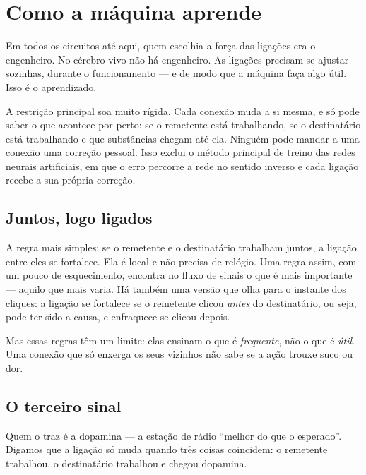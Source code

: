\chapter{Como a máquina aprende}

Em todos os circuitos até aqui, quem escolhia a força das ligações era o engenheiro. No cérebro vivo não há engenheiro. As ligações precisam se ajustar sozinhas, durante o funcionamento --- e de modo que a máquina faça algo útil. Isso é o aprendizado.

A restrição principal soa muito rígida. Cada conexão muda a si mesma, e só pode saber o que acontece por perto: se o remetente está trabalhando, se o destinatário está trabalhando e que substâncias chegam até ela. Ninguém pode mandar a uma conexão uma correção pessoal. Isso exclui o método principal de treino das redes neurais artificiais, em que o erro percorre a rede no sentido inverso e cada ligação recebe a sua própria correção.

\section*{Juntos, logo ligados}

A regra mais simples: se o remetente e o destinatário trabalham juntos, a ligação entre eles se fortalece. Ela é local e não precisa de relógio. Uma regra assim, com um pouco de esquecimento, encontra no fluxo de sinais o que é mais importante --- aquilo que mais varia. Há também uma versão que olha para o instante dos cliques: a ligação se fortalece se o remetente clicou \emph{antes} do destinatário, ou seja, pode ter sido a causa, e enfraquece se clicou depois.

Mas essas regras têm um limite: elas ensinam o que é \emph{frequente}, não o que é \emph{útil}. Uma conexão que só enxerga os seus vizinhos não sabe se a ação trouxe suco ou dor.

\section*{O terceiro sinal}

Quem o traz é a dopamina --- a estação de rádio ``melhor do que o esperado''. Digamos que a ligação só muda quando três coisas coincidem: o remetente trabalhou, o destinatário trabalhou e chegou dopamina.


